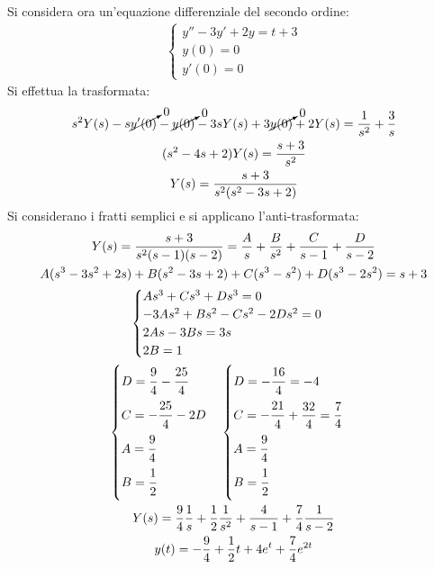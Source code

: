\documentclass{article}
\numberwithin{equation}{subsection}
\begin{document}
Si considera ora un'equazione differenziale del secondo ordine:
\begin{gather*}
    \begin{cases}
        y''-3y'+2y=t+3\\
        y(0)=0\\
        y'(0)=0
    \end{cases}
\end{gather*}
Si effettua la trasformata:
\begin{gather*}
    s^2Y(s)-s\cancelto{0}{y'(0)}-\cancelto{0}{y(0)}-3sY(s)+3\cancelto{0}{y(0)}+2Y(s)=\frac{1}{s^2}+\frac{3}{s}\\
    (s^2-4s+2)Y(s)=\frac{s+3}{s^2}\\
    Y(s)=\frac{s+3}{s^2(s^2-3s+2)}
\end{gather*}
Si considerano i fratti semplici e si applicano l'anti-trasformata:
\begin{gather*}
    Y(s)=\frac{s+3}{s^2(s-1)(s-2)}=\frac{A}{s}+\frac{B}{s^2}+\frac{C}{s-1}+\frac{D}{s-2}\\
    A(s^3-3s^2+2s)+B(s^2-3s+2)+C(s^3-s^2)+D(s^3-2s^2)=s+3\\
    \begin{cases}
        As^3+Cs^3+Ds^3=0\\
        -3As^2+Bs^2-Cs^2-2Ds^2=0\\
        2As-3Bs=3s\\
        2B=1
    \end{cases}\\
    \begin{cases}
        D=\displaystyle\frac{\strut9}{\strut4}-\displaystyle\frac{\strut25}{\strut4}\\
        C=-\displaystyle\frac{\strut25}{\strut4}-2D\\
        A=\displaystyle\frac{\strut9}{\strut4}\\
        B=\displaystyle\frac{\strut1}{\strut2}
    \end{cases}
    \begin{cases}
        D=-\displaystyle\frac{\strut16}{\strut4}=-4\\
        C=-\displaystyle\frac{\strut21}{\strut4}+\frac{32}{\strut4}=\frac{7}{4}\\
        A=\displaystyle\frac{\strut9}{\strut4}\\
        B=\displaystyle\frac{\strut1}{\strut2}
    \end{cases}\\
    Y(s)=\frac{9}{4}\frac{1}{s}+\frac{1}{2}\frac{1}{s^2}+\frac{4}{s-1}+\frac{7}{4}\frac{1}{s-2}\\
    y(t)=-\frac{9}{4}+\frac{1}{2}t+4e^t+\frac{7}{4}e^{2t}
\end{gather*}
\end{document}
